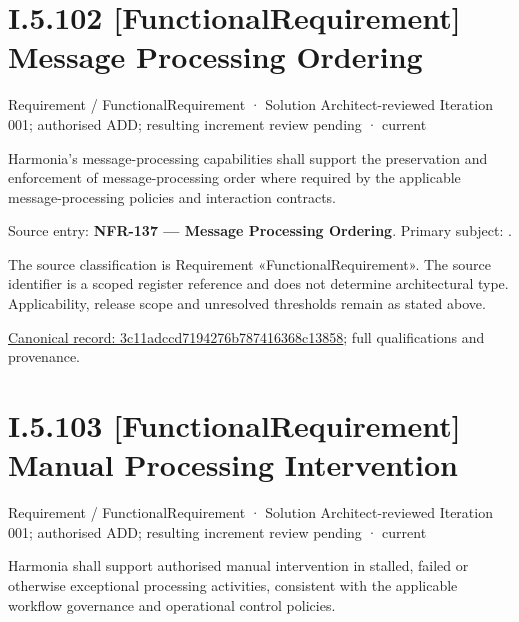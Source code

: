 \section*{I.5.102 [FunctionalRequirement] Message Processing Ordering}
\label{navigation:I.5.102}

\label{element:3c11adccd7194276b787416368c13858}
{\small Requirement / FunctionalRequirement · Solution Architect-reviewed Iteration 001; authorised ADD; resulting increment review pending · current}\par

Harmonia's message-processing capabilities shall support the preservation and enforcement of message-processing order where required by the applicable message-processing policies and interaction contracts.



Source entry: \textbf{NFR-137 — Message Processing Ordering}. Primary subject: \texttt{}.



The source classification is Requirement «FunctionalRequirement». The source identifier is a scoped register reference and does not determine architectural type. Applicability, release scope and unresolved thresholds remain as stated above.


{\footnotesize \href{../../../../continuum/motivation/requirement/functional-requirement/3c11adccd7194276b787416368c13858.md}{Canonical record: 3c11adccd7194276b787416368c13858}; full qualifications and provenance.}\par
\section*{I.5.103 [FunctionalRequirement] Manual Processing Intervention}
\label{navigation:I.5.103}

\label{element:911511665a8a4135b7f2a37f5f79ad36}
{\small Requirement / FunctionalRequirement · Solution Architect-reviewed Iteration 001; authorised ADD; resulting increment review pending · current}\par

Harmonia shall support authorised manual intervention in stalled, failed or otherwise exceptional processing activities, consistent with the applicable workflow governance and operational control policies.




